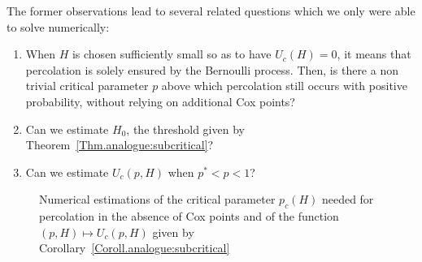 \documentclass[10pt,a4paper]{amsart}
\theoremstyle{exampstyle}
\theoremstyle{exampnotations}
\begin{document}
The former observations lead to several related questions which we only were able to solve numerically:
\begin{enumerate}
    \item When $H$ is chosen sufficiently small so as to have $U_c(H)=0$, it means that percolation is solely ensured by the Bernoulli process. Then, is there a non trivial critical parameter $p$ above which percolation still occurs with positive probability, without relying on additional Cox points?
    \item Can we estimate $H_0$, the threshold given by Theorem~\ref{Thm.analogue:subcritical}?
    \item Can we estimate $U_c(p,H)$ when $p^* < p < 1$?
\end{enumerate}
\begin{figure}[h!]
\centering
\setlength{\lineskip}{\medskipamount}
\hfill
{}\hfill
\caption{Numerical estimations of the critical parameter $p_c(H)$ needed for percolation in the absence of Cox points and of the function $(p,H) \mapsto U_c(p,H)$ given by  Corollary~\ref{Coroll.analogue:subcritical}} \label{fig:additionalquestions}
\end{figure}
\end{document}
